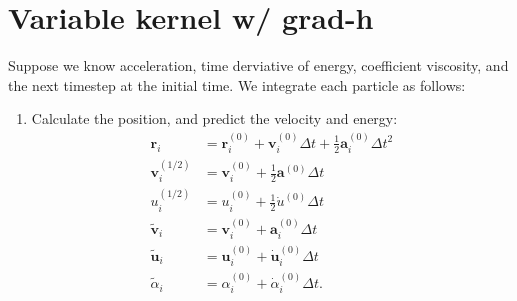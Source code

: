 \documentclass[fleqn,dvipdfmx]{article}
\begin{document}
\section{Variable kernel w/ grad-h}

Suppose we know acceleration, time derviative of energy, coefficient
viscosity, and the next timestep at the initial time. We integrate
each particle as follows:
\begin{enumerate}
\item Calculate the position, and predict the velocity and energy:
  \begin{align}
    \bm{r}_{i} &= \bm{r}^{(0)}_i + \bm{v}^{(0)}_i \Delta t +
    \frac{1}{2} \bm{a}^{(0)}_i \Delta t^2 \\
    \bm{v}^{(1/2)}_i &= \bm{v}^{(0)}_i + \frac{1}{2} \bm{a}^{(0)}
    \Delta t \\
    u^{(1/2)}_i &= u^{(0)}_i + \frac{1}{2} \dot{u}^{(0)} \Delta t \\
    \tilde{\bm{v}}_{i} &= \bm{v}^{(0)}_i + \bm{a}^{(0)}_i \Delta t \\
    \tilde{\bm{u}}_{i} &= \bm{u}^{(0)}_i + \dot{\bm{u}}^{(0)}_i \Delta
    t \\
    \tilde{\alpha}_i &= \alpha^{(0)}_i + \dot{\alpha}^{(0)}_i \Delta t.
  \end{align}


\end{enumerate}
\end{document}
